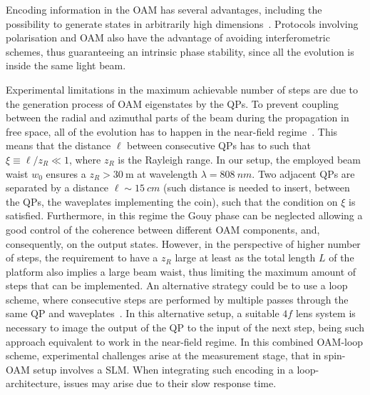 Encoding information in the OAM has several advantages, including the possibility to generate states in arbitrarily high dimensions~\cite{fickler2012quantum,dambrosio2013photonic}. Protocols involving polarisation and OAM also have the advantage of avoiding interferometric schemes, thus guaranteeing an intrinsic phase stability, since all the evolution is inside the same light beam.

Experimental limitations in the maximum achievable number of steps are due to the generation process of \ac{OAM} eigenstates by the \acp{QP}. To prevent coupling between the radial and azimuthal parts of the beam during the propagation in free space, all of the evolution has to happen in the near-field regime~\cite{karimi2009light,cardano2015quantum}. This means that the distance $\ell$ between consecutive \acp{QP} has to such that $\xi\equiv \ell/z_R \ll 1 $, where $z_R$ is the Rayleigh range.
In our setup, the employed beam waist $w_0$  ensures a $z_R> \SI{30}{\meter}$ at wavelength $\lambda=\SI{808}{nm}$. Two adjacent \acp{QP} are separated by a distance $\ell \sim \SI{15}{cm}$ (such distance is needed to insert, between the \acp{QP}, the waveplates implementing the coin), such that the condition on $\xi$ is satisfied.  Furthermore, in this regime the Gouy phase can be neglected allowing a good control of the coherence between different \ac{OAM} components, and, consequently, on the output states. However, in the perspective of higher number of steps, the requirement to have a $z_R$ large at least as the total length $L$ of the platform also implies a large beam waist, thus limiting the maximum amount of steps that can be implemented. An alternative strategy could be to use a loop scheme, where consecutive steps are performed by multiple passes through the same \ac{QP} and waveplates~\cite{goyal2013implementing}. In this alternative setup, a suitable $4f$ lens system is necessary to image the output of the QP to the input of the next step, being such approach equivalent to work in the near-field regime.  
In this combined \ac{OAM}-loop scheme, experimental challenges arise at the measurement stage, that in spin-\ac{OAM} setup involves a \ac{SLM}. When integrating such encoding in a loop-architecture, issues may arise due to their slow response time.


